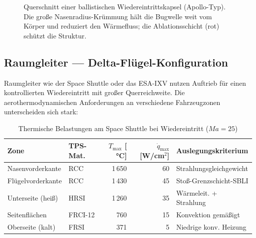 ﻿\documentclass[12pt,a4paper]{article}
\newcommand{\Ma}{M\!a}
\begin{document}
\begin{figure}[H]
\caption{Querschnitt einer ballistischen Wiedereintrittskapsel (Apollo-Typ).
Die große Nasenradius-Krümmung hält die Bugwelle weit vom Körper und reduziert
den Wärmefluss; die Ablationsschicht (rot) schützt die Struktur.}
\label{fig:kapsel}
\end{figure}

\subsection{Raumgleiter --- Delta-Flügel-Konfiguration}

Raumgleiter wie der Space Shuttle oder das ESA-IXV nutzen Auftrieb für einen
kontrollierten Wiedereintritt mit großer Querreichweite. Die aerothermodynamischen
Anforderungen an verschiedene Fahrzeugzonen unterscheiden sich stark:

\begin{table}[H]
\centering
\caption{Thermische Belastungen am Space Shuttle bei Wiedereintritt ($\Ma=25$)}
\label{tab:shuttle_zonen}
\begin{tabular}{llrrl}
\toprule
\textbf{Zone} & \textbf{TPS-Mat.} & $T_{\max}$ [ °C] & $\dot{q}_{\max}$ [W/cm$^2$] & \textbf{Auslegungskriterium}\\
\midrule
Nasenvorderkante   & RCC          & 1\,650 & 60  & Strahlungsgleichgewicht\\
Flügelvorderkante         & RCC          & 1\,430 & 45  & Stoß-Grenzschicht-SBLI\\
Unterseite (heiß)         & HRSI  & 1\,260 & 35  & Wärmeleit. + Strahlung\\
Seitenflächen             & FRCI-12      & 760    & 15  & Konvektion gemäßigt\\
Oberseite (kalt)          & FRSI         & 371    & 5   & Niedrige konv. Heizung\\
\bottomrule
\end{tabular}
\end{table}
\end{document}
